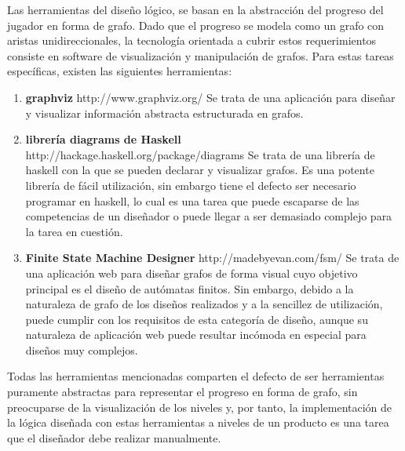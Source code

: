 Las herramientas del diseño lógico, se basan en la abstracción del progreso del jugador en forma de grafo.
Dado que el progreso se modela como un grafo con aristas unidireccionales, la tecnología orientada a cubrir estos requerimientos consiste en software de visualización y manipulación de grafos. Para estas tareas específicas, existen las siguientes herramientas:
\begin{enumerate}
	\item \textbf{graphviz} http://www.graphviz.org/ Se trata de una aplicación para diseñar y visualizar información abstracta estructurada en grafos.
	\item \textbf{librería diagrams de Haskell} http://hackage.haskell.org/package/diagrams Se trata de una librería de haskell con la que se pueden declarar y visualizar grafos. Es una potente librería de fácil utilización, sin embargo tiene el defecto ser necesario programar en haskell, lo cual es una tarea que puede escaparse de las competencias de un diseñador o puede llegar a ser demasiado complejo para la tarea en cuestión.
	\item \textbf{Finite State Machine Designer} http://madebyevan.com/fsm/ Se trata de una aplicación web para diseñar grafos de forma visual cuyo objetivo principal es el diseño de autómatas finitos. Sin embargo, debido a la naturaleza de grafo de los diseños realizados y a la sencillez de utilización, puede cumplir con los requisitos de esta categoría de diseño, aunque su naturaleza de aplicación web puede resultar incómoda en especial para diseños muy complejos.
\end{enumerate}
Todas las herramientas mencionadas comparten el defecto de ser herramientas puramente abstractas para representar el progreso en forma de grafo, sin preocuparse de la visualización de los niveles y, por tanto, la implementación de la lógica diseñada con estas herramientas a niveles de un producto es una tarea que el diseñador debe realizar manualmente.